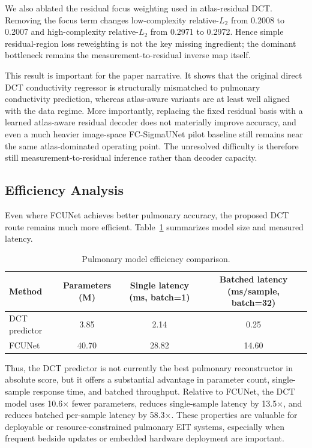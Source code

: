 \documentclass[11pt,a4paper]{article}
\begin{document}
We also ablated the residual focus weighting used in atlas-residual DCT. Removing the focus term changes low-complexity relative-$L_2$ from 0.2008 to 0.2007 and high-complexity relative-$L_2$ from 0.2971 to 0.2972. Hence simple residual-region loss reweighting is not the key missing ingredient; the dominant bottleneck remains the measurement-to-residual inverse map itself.

This result is important for the paper narrative. It shows that the original direct DCT conductivity regressor is structurally mismatched to pulmonary conductivity prediction, whereas atlas-aware variants are at least well aligned with the data regime. More importantly, replacing the fixed residual basis with a learned atlas-aware residual decoder does not materially improve accuracy, and even a much heavier image-space FC-SigmaUNet pilot baseline still remains near the same atlas-dominated operating point. The unresolved difficulty is therefore still measurement-to-residual inference rather than decoder capacity.

\subsection{Efficiency Analysis}
Even where FCUNet achieves better pulmonary accuracy, the proposed DCT route remains much more efficient. Table~\ref{tab:efficiency} summarizes model size and measured latency.

\begin{table}[htbp]
    \centering
    \caption{Pulmonary model efficiency comparison.}
    \label{tab:efficiency}
    \begin{tabular}{lccc}
        \toprule
        Method & Parameters (M) & Single latency (ms, batch=1) & Batched latency (ms/sample, batch=32) \\
        \midrule
        DCT predictor & 3.85 & 2.14 & 0.25 \\
        FCUNet & 40.70 & 28.82 & 14.60 \\
        \bottomrule
    \end{tabular}
\end{table}

Thus, the DCT predictor is not currently the best pulmonary reconstructor in absolute score, but it offers a substantial advantage in parameter count, single-sample response time, and batched throughput. Relative to FCUNet, the DCT model uses 10.6$\times$ fewer parameters, reduces single-sample latency by 13.5$\times$, and reduces batched per-sample latency by 58.3$\times$. These properties are valuable for deployable or resource-constrained pulmonary EIT systems, especially when frequent bedside updates or embedded hardware deployment are important.
\end{document}
